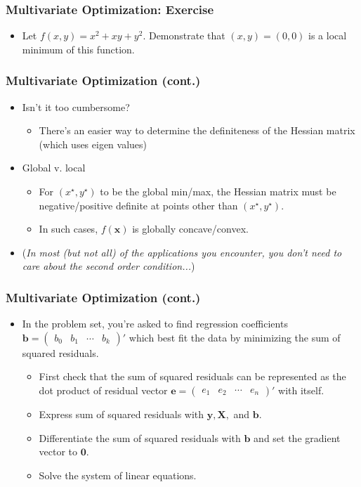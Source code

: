 \documentclass[pdflatex, 12pt]{beamer}
\begin{document}
\begin{frame}
\frametitle{Multivariate Optimization: Exercise}
\begin{itemize}
\item Let $f(x, y) = x^2 + xy + y^2$. Demonstrate that $(x, y) = (0, 0)$ is a local minimum of this function. 
\end{itemize}
\end{frame}

\begin{frame}
\frametitle{Multivariate Optimization (cont.)}
\begin{itemize}
\item Isn't it too cumbersome?
 \begin{itemize}
 \item There's an easier way to determine the definiteness of the Hessian matrix (which uses eigen values)
 \end{itemize}
\vspace{0.4cm}
\item Global v. local
 \begin{itemize}
 \item For $(x^{\star}, y^{\star})$ to be the global min/max, the Hessian matrix must be negative/positive definite at points other than $(x^{\star}, y^{\star})$.
 \item In such cases, $f(\bm{x})$ is globally concave/convex. 
 \end{itemize}
\vspace{0.4cm}
\item (\emph{In most (but not all) of the applications you encounter, you don't need to care about the second order condition...})
\end{itemize}
\end{frame}

\begin{frame}
\frametitle{Multivariate Optimization (cont.)}
\begin{itemize}
\item In the problem set, you're asked to find regression coefficients $\bm{b} = \begin{pmatrix}
b_0 & b_1 & \cdots & b_k
\end{pmatrix}'$ which best fit the data by minimizing the sum of squared residuals.
 \begin{itemize}
 \item First check that the sum of squared residuals can be represented as the dot product of residual vector $\bm{e} = \begin{pmatrix}
 e_1 & e_2 & \cdots & e_n
 \end{pmatrix}'$ with itself.
 \item Express sum of squared residuals with $\bm{y}, \bm{X}, $ and $\bm{b}$.
 \item Differentiate the sum of squared residuals with $\bm{b}$ and set the gradient vector to $\bm{0}$.
 \item Solve the system of linear equations. 
 \end{itemize}
\end{itemize}
\end{frame}
\end{document}
